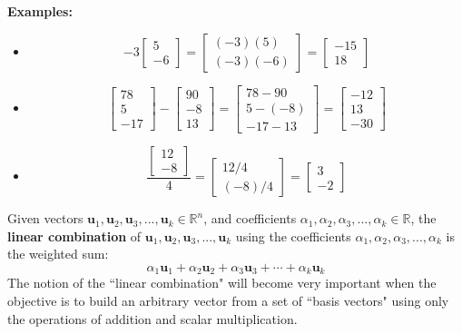 \documentclass{article}
\begin{document}
\textbf{Examples:}
\begin{itemize}
\item 
\[-3\begin{bmatrix} 5 \\ -6 \end{bmatrix} = \begin{bmatrix} (-3)(5) \\ (-3)(-6) \end{bmatrix} = \begin{bmatrix} -15 \\ 18 \end{bmatrix}\]
\item 
\[\begin{bmatrix} 78 \\ 5 \\ -17 \end{bmatrix} - \begin{bmatrix} 90 \\ -8 \\ 13 \end{bmatrix} = \begin{bmatrix} 78 - 90 \\ 5 - (-8) \\ -17 - 13 \end{bmatrix} = \begin{bmatrix} -12 \\ 13 \\ -30 \end{bmatrix}\]
\item 
\[\frac{\begin{bmatrix} 12 \\ -8 \end{bmatrix}}{4} = \begin{bmatrix} 12/4 \\ (-8)/4 \end{bmatrix} = \begin{bmatrix} 3 \\ -2 \end{bmatrix}\]
\end{itemize}

Given vectors \(\mathbf{u}_1, \mathbf{u}_2, \mathbf{u}_3, ..., \mathbf{u}_k \in \mathbb{R}^n\), and coefficients \(\alpha_1, \alpha_2, \alpha_3, ..., \alpha_k \in \mathbb{R}\), the {\bf linear combination} of \(\mathbf{u}_1, \mathbf{u}_2, \mathbf{u}_3, ..., \mathbf{u}_k\) using the coefficients \(\alpha_1, \alpha_2, \alpha_3, ..., \alpha_k\) is the weighted sum:
\[\alpha_1 \mathbf{u}_1 + \alpha_2 \mathbf{u}_2 + \alpha_3 \mathbf{u}_3 + \cdots + \alpha_k \mathbf{u}_k\]  
The notion of the ``linear combination" will become very important when the objective is to build an arbitrary vector from a set of ``basis vectors" using only the operations of addition and scalar multiplication.
\end{document}
